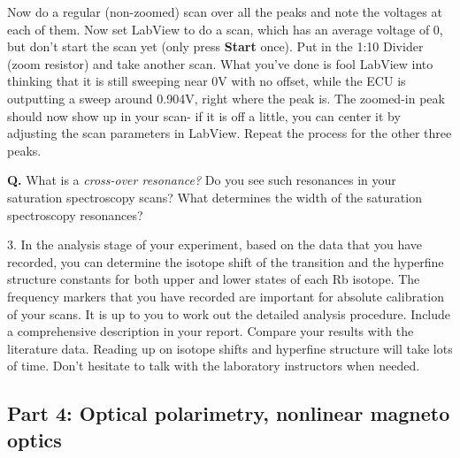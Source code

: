 \documentclass{../lab}
\begin{document}
Now do a regular (non-zoomed) scan over all the peaks and note the voltages at each of them. Now set LabView to do a scan, which has an average voltage of 0, but don't start the scan yet (only press \textbf{Start} once). Put in the 1:10 Divider (zoom resistor) and take another scan. What you've done is fool LabView into thinking that it is still sweeping near 0V with no offset, while the ECU is outputting a sweep around 0.904V, right where the peak is. The zoomed-in peak should now show up in your scan- if it is off a little, you can center it by adjusting the scan parameters in LabView. Repeat the process for the other three peaks.

\textbf{Q.} What is a \emph{cross-over resonance?} Do you see such resonances in your saturation spectroscopy scans? What determines the width of the saturation spectroscopy resonances?

3. In the analysis stage of your experiment, based on the data that you have recorded, you can determine the isotope shift of the transition and the hyperfine structure constants for both upper and lower states of each Rb isotope. The frequency markers that you have recorded are important for absolute calibration of your scans. It is up to you to work out the detailed analysis procedure. Include a comprehensive description in your report. Compare your results with the literature data. Reading up on isotope shifts and hyperfine structure will take lots of time. Don't hesitate to talk with the laboratory instructors when needed.

\subsection{Part 4: Optical polarimetry, nonlinear magneto optics}
\end{document}
